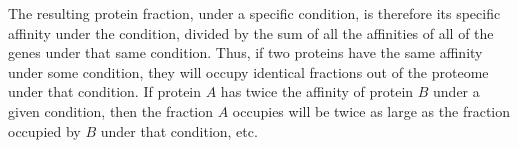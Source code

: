 The resulting protein fraction, under a specific condition, is therefore its specific affinity under the condition, divided by the sum of all the affinities of all of the genes under that same condition.
Thus, if two proteins have the same affinity under some condition, they will occupy identical fractions out of the proteome under that condition.
If protein $A$ has twice the affinity of protein $B$ under a given condition, then the fraction $A$ occupies will be twice as large as the fraction occupied by $B$ under that condition, etc.
